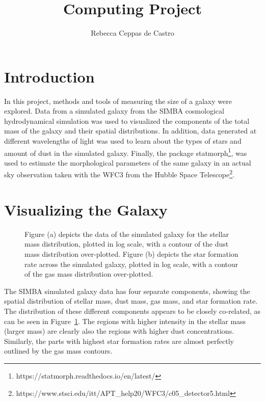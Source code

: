 \documentclass[10pt, preprint]{aastex}
\title{Computing Project}
\author{Rebecca Ceppas de Castro}
\begin{document}
\maketitle

\section*{Introduction}

In this project, methods and tools of measuring the size of a galaxy were explored. Data from a simulated galaxy from the SIMBA cosmological hydrodynamical simulation was used to visualized the components of the total mass of the galaxy and their spatial distributions. In addition, data generated at different wavelengths of light was used to learn about the types of stars and amount of dust in the simulated galaxy. Finally, the package statmorph\footnote{https://statmorph.readthedocs.io/en/latest/}, was used to estimate the morphological parameters of the same galaxy in an actual sky observation taken with the WFC3 from the Hubble Space Telescope\footnote{https://www.stsci.edu/itt/APT_help20/WFC3/c05_detector5.html}.


\section{Visualizing the Galaxy}

\begin{figure}[H]
  \centering
  \hfill
  \caption{\label{contour plots} Figure (a) depicts the data of the simulated galaxy for the stellar mass distribution, plotted in log scale, with a contour of the dust mass distribution over-plotted. Figure (b) depicts the star formation rate across the simulated galaxy, plotted in log scale, with a contour of the gas mass distribution over-plotted.}
\end{figure}

The SIMBA simulated galaxy data has four separate components, showing the spatial distribution of stellar mass, dust mass, gas mass, and star formation rate. The distribution of these different components appears to be closely co-related, as can be seen in   Figure~\ref{contour plots}. The regions with higher intensity in the stellar mass (larger mass) are clearly also the regions with higher dust concentrations. Similarly, the parts with highest star formation rates are almost perfectly outlined by the gas mass contours.
\end{document}
